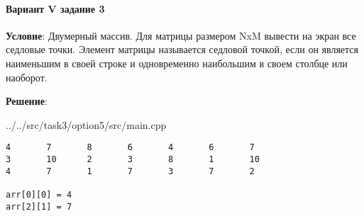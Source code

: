 \paragraph{Вариант V задание 3} \hspace{0pt}

\textbf{Условие}:
Двумерный массив.
Для матрицы размером NxM вывести на экран все седловые точки. Элемент матрицы называется седловой точкой, если он является наименьшим в своей строке и одновременно наибольшим в своем столбце или наоборот.

\textbf{Решение}:


{../../src/task3/option5/src/main.cpp}

\begin{lstlisting}[language=Out,]
4       7       8       6       4       6       7
3       10      2       3       8       1       10
4       7       1       7       3       7       2

arr[0][0] = 4
arr[2][1] = 7
\end{lstlisting}
